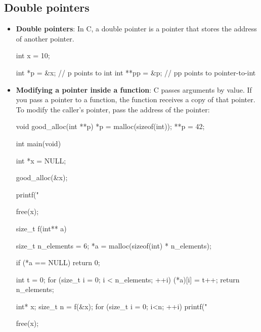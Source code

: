 \documentclass{report}
\begin{document}
        \pagebreak 
        \subsection{Double pointers}
        \begin{itemize}
            \item \textbf{Double pointers}: In C, a double pointer is a pointer that stores the address of another pointer.
                \bigbreak \noindent 
                \begin{cppcode}
                int x = 10;

                int *p = &x;    // p points to int
                int **pp = &p;  // pp points to pointer-to-int
                \end{cppcode}
            \item \textbf{Modifying a pointer inside a function}: C passes arguments by value. If you pass a pointer to a function, the function receives a copy of that pointer.
                \bigbreak \noindent 
                To modify the caller’s pointer, pass the address of the pointer:
                \bigbreak \noindent 
                \begin{cppcode}
                    void good_alloc(int **p) {
                        *p = malloc(sizeof(int));
                        **p = 42;
                    }

                    int main(void) {
                        int *x = NULL;

                        good_alloc(&x);

                        printf("%

                        free(x);
                    }
                \end{cppcode}

                \bigbreak \noindent 
                \begin{cppcode}
                    size_t f(int** a) {
                        size_t n_elements = 6;
                        *a = malloc(sizeof(int) * n_elements); 

                        if (*a == NULL) return 0;

                        int t = 0;
                        for (size_t i = 0; i < n_elements; ++i) {
                            (*a)[i] = t++;
                        }
                        return n_elements;
                    }

                    int* x;
                    size_t n = f(&x);
                    for (size_t i = 0; i<n; ++i) {
                        printf("%
                    }

                    free(x);
                \end{cppcode}

        \end{itemize}
\end{document}
